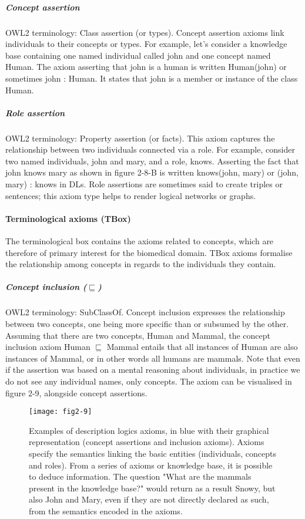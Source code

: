 \subparagraph{Concept assertion\\}
OWL2 terminology: Class assertion (or types). Concept assertion axioms link individuals to their concepts or types. For example, let's consider a knowledge base containing one named individual called john and one concept named Human. The axiom asserting that john is a human is written Human(john) or sometimes john : Human. It states that john is a member or instance of the class Human.

\subparagraph{Role assertion\\}
OWL2 terminology: Property assertion (or facts). This axiom captures the relationship between two individuals connected via a role. For example, consider two named individuals, john and mary, and a role, knows. Asserting the fact that john knows mary as shown in figure 2-8-B is written knows(john, mary) or (john, mary) : knows in DLs. Role assertions are sometimes said to create triples or sentences; this axiom type helps to render logical networks or graphs.

\paragraph{\textbf{Terminological axioms (TBox)}\\}

The terminological box contains the axioms related to concepts, which are therefore of primary interest for the biomedical domain. TBox axioms formalise the relationship among concepts in regards to the individuals they contain.

\subparagraph{Concept inclusion ($ \sqsubseteq $)\\}
OWL2 terminology: SubClassOf. Concept inclusion expresses the relationship between two concepts, one being more specific than or subsumed by the other. Assuming that there are two concepts, Human and Mammal, the concept inclusion axiom Human $ \sqsubseteq $ Mammal entails that all instances of Human are also instances of Mammal, or in other words all humans are mammals. Note that even if the assertion was based on a mental reasoning about individuals, in practice we do not see any individual names, only concepts. The axiom can be visualised in figure 2-9, alongside concept assertions.

\begin{figure}[ht]
    \centering
    \texttt{[image: fig2-9]}
    \caption{Examples of description logics axioms, in blue with their graphical representation (concept assertions and inclusion axioms). Axioms specify the semantics linking the basic entities (individuals, concepts and roles). From a series of axioms or knowledge base, it is possible to deduce information. The question "What are the mammals present in the knowledge base?" would return as a result Snowy, but also John and Mary, even if they are not directly declared as such, from the semantics encoded in the axioms.}
    \label{fig2-9}
\end{figure}

